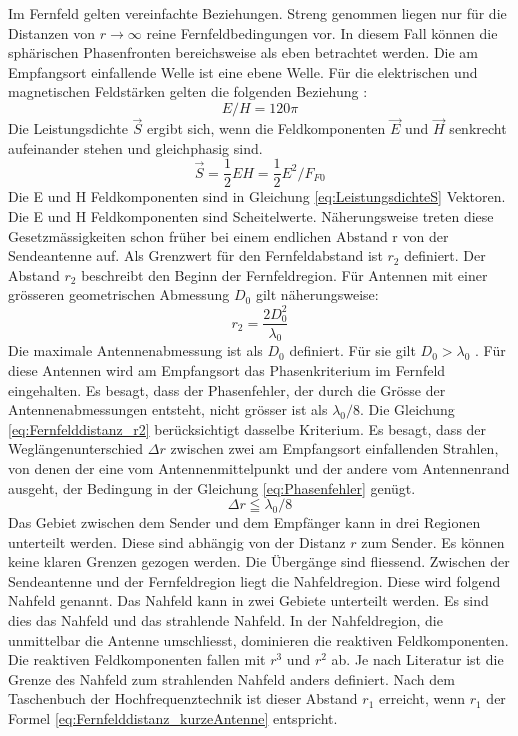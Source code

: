 Im Fernfeld gelten vereinfachte Beziehungen. Streng genommen liegen nur für die Distanzen von $r\rightarrow\infty$ reine Fernfeldbedingungen vor. In diesem Fall können die sphärischen Phasenfronten  bereichsweise als eben betrachtet werden. Die am Empfangsort einfallende Welle ist eine ebene Welle. Für die  elektrischen und magnetischen Feldstärken gelten die folgenden  Beziehung  \cite{meinke1992taschenbuch}:
\begin{equation}
E/H=120\pi\label{eq:WellenimpedanuE/H}
\end{equation}
Die Leistungsdichte $\vec{S}$ ergibt sich, wenn die Feldkomponenten $\vec{E}$  und $\vec{H}$ senkrecht aufeinander stehen und gleichphasig sind.
\begin{equation}
\vec{S}=\dfrac{1}{2}EH=\dfrac{1}{2} E^{2}/F_{F0}\label{eq:LeistungsdichteS}
\end{equation}
Die E und H Feldkomponenten sind in Gleichung \ref{eq:LeistungsdichteS}  Vektoren. Die E und H Feldkomponenten sind Scheitelwerte.
Näherungsweise treten diese Gesetzmässigkeiten  schon früher bei einem endlichen Abstand r von der Sendeantenne auf. Als Grenzwert für den Fernfeldabstand ist $r_{2}$ definiert. Der Abstand $r_2$ beschreibt den Beginn der Fernfeldregion.   Für Antennen mit einer grösseren geometrischen Abmessung $D_{0}$ gilt näherungsweise\cite{meinke1992taschenbuch}:
\begin{equation}
r_{2}=\dfrac{2D_{0}^{2}}{\lambda_{0}} \label{eq:Fernfelddistanz_r2}
\end{equation}
Die maximale Antennenabmessung ist als $D_{0}$ definiert. Für sie gilt $D_{0}>\lambda_{0}$ . Für diese Antennen wird am Empfangsort das Phasenkriterium im Fernfeld eingehalten. Es besagt, dass der Phasenfehler, der durch die Grösse der Antennenabmessungen entsteht, nicht grösser ist als $\lambda_{0}/8$.  Die Gleichung \ref{eq:Fernfelddistanz_r2} berücksichtigt dasselbe Kriterium. Es besagt, dass der Weglängenunterschied $\Delta r$ zwischen zwei am Empfangsort einfallenden Strahlen, von denen der eine vom Antennenmittelpunkt und der andere vom Antennenrand ausgeht, der Bedingung in der Gleichung \ref{eq:Phasenfehler} genügt\cite{meinke1992taschenbuch}.
\begin{equation}
\Delta r\leqq\lambda_{0}/8 \label{eq:Phasenfehler}
\end{equation}
Das Gebiet zwischen dem Sender und dem Empfänger kann in drei Regionen unterteilt werden. Diese sind abhängig von der Distanz $r$ zum Sender. Es können keine klaren Grenzen gezogen werden. Die Übergänge sind fliessend. Zwischen der Sendeantenne und der Fernfeldregion liegt die Nahfeldregion. Diese wird folgend Nahfeld genannt. Das Nahfeld kann in zwei Gebiete unterteilt werden. Es sind dies das Nahfeld und das strahlende Nahfeld. In der  Nahfeldregion, die unmittelbar die Antenne umschliesst, dominieren die reaktiven Feldkomponenten. Die reaktiven Feldkomponenten fallen  mit $r^{3}$ und $r^{2}$ ab.  Je nach Literatur ist die Grenze des Nahfeld zum strahlenden Nahfeld anders definiert. Nach dem Taschenbuch der Hochfrequenztechnik ist dieser Abstand $r_{1}$ erreicht, wenn $r_{1}$ der Formel \ref{eq:Fernfelddistanz_kurzeAntenne} entspricht\cite{meinke1992taschenbuch}.
